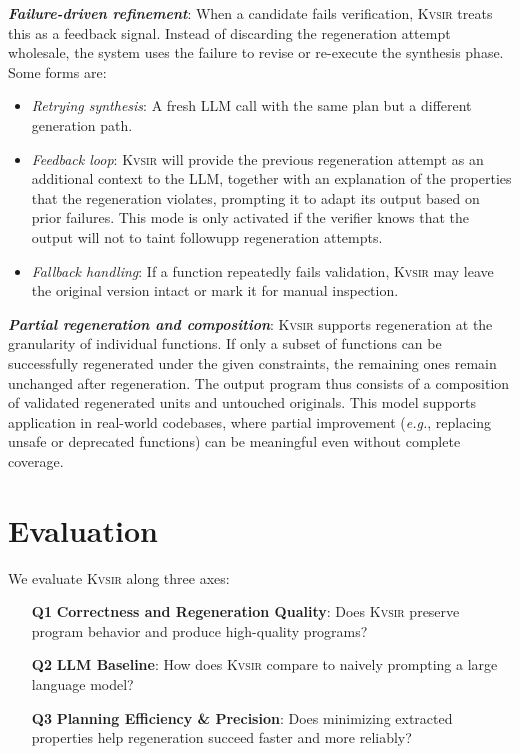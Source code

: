 \documentclass[noacm,sigplan,review]{acmart}
\def\eg{{\em e.g.}, }
\newcommand{\sys}{{\scshape Kv{\textalpha}sir}\xspace}
\newcommand{\heading}[1]{\vspace{2pt}\noindent\textbf{\emph{#1}}:\enspace}
\begin{document}
\heading{Failure-driven refinement}
When a candidate fails verification, \sys treats this as a feedback signal. Instead of discarding the regeneration attempt wholesale, the system uses the failure to revise or re-execute the synthesis phase.
Some forms are:
\begin{itemize}
  \item \emph{Retrying synthesis}: A fresh LLM call with the same plan but a different generation path.
  \item \emph{Feedback loop}: \sys will provide the previous regeneration attempt 
    as an additional context to the LLM, together with an explanation of the properties that the regeneration violates, prompting it to adapt its output based on prior failures.
    This mode is only activated if the verifier knows that the output will not to taint
    followupp regeneration attempts.
  \item \emph{Fallback handling}: If a function repeatedly fails validation, \sys may leave the original version intact or mark it for manual inspection.
\end{itemize}


\heading{Partial regeneration and composition}
\sys supports regeneration at the granularity of individual functions.
If only a subset of functions can be successfully regenerated under the given constraints, the remaining ones remain unchanged after regeneration.
The output program thus consists of a composition of validated regenerated units and untouched originals.
This model supports application in real-world codebases, where partial improvement (\eg replacing unsafe or deprecated functions) can be meaningful even without complete coverage.

\section{Evaluation}
\label{sec:evaluation}

We evaluate \sys along three axes:

\begin{itemize}
  \item[\textbf{Q1}] \textbf{Correctness and Regeneration Quality}: Does \sys preserve program behavior and produce high-quality programs?
  \item[\textbf{Q2}] \textbf{LLM Baseline}: How does \sys compare to naively prompting a large language model?
  \item[\textbf{Q3}] \textbf{Planning Efficiency \& Precision}: Does minimizing extracted properties help regeneration succeed faster and more reliably?
\end{itemize}
\end{document}
